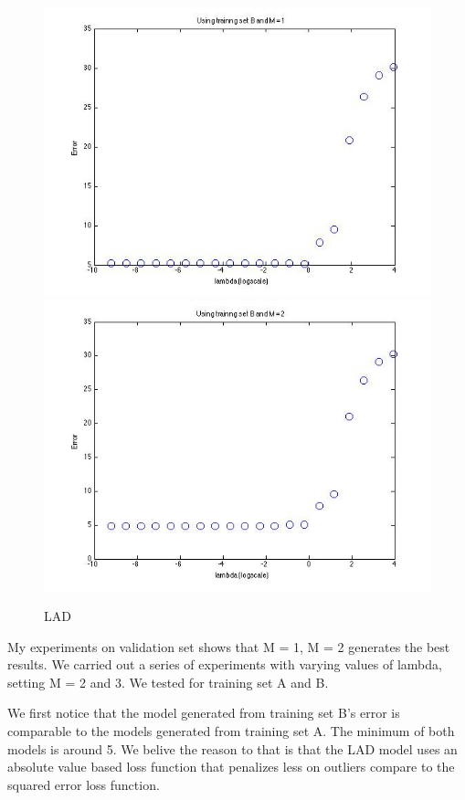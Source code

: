 \begin{figure}[!htb]
                                                                                 \includegraphics[width=\linewidth]{figures/p4_LAD_regressB_m=1}
\endminipage\hfill
{}
  \includegraphics[width=\linewidth]{figures/p4_LAD_regressB_m=2}
\endminipage\hfill
\caption{LAD}
\end{figure}

My experiments on validation set shows that M = 1, M = 2 generates the
best results. We carried out a series of experiments with varying values
of lambda, setting M = 2 and 3. We tested for training set A and B. 

We first notice that the model generated from training set B's error
is comparable to the models generated from training set A. The minimum of
both models is around 5. We belive the reason to that is that the 
LAD model uses an absolute value based loss function that penalizes less
on outliers compare to the squared error loss function. 

